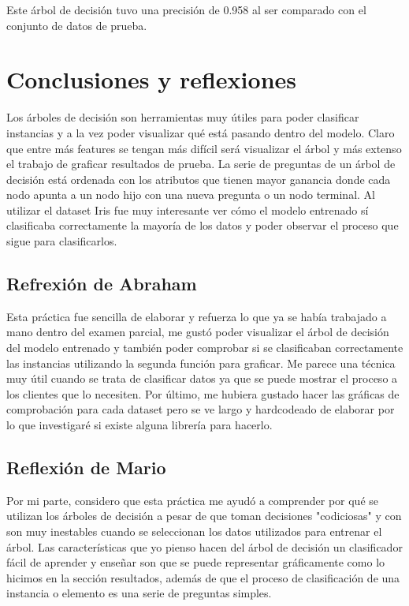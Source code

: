 \documentclass[sigconf,authorversion,nonacm]{acmart}
\begin{document}
Este árbol de decisión tuvo una precisión de 0.958 al ser comparado con el conjunto de datos de prueba.

\section{Conclusiones y reflexiones}
Los árboles de decisión son herramientas muy útiles para poder clasificar instancias y a la vez poder visualizar qué está pasando dentro del modelo. Claro que entre más features se tengan más difícil será visualizar el árbol y más extenso el trabajo de graficar resultados de prueba. La serie de preguntas de un árbol de decisión está ordenada con los atributos que tienen mayor ganancia donde cada nodo apunta a un nodo hijo con una nueva pregunta o un nodo terminal.
Al utilizar el dataset Iris fue muy interesante ver cómo el modelo entrenado sí clasificaba correctamente la mayoría de los datos y poder observar el proceso que sigue para clasificarlos.

\subsection{Refrexión de Abraham}
Esta práctica fue sencilla de elaborar y refuerza lo que ya se había trabajado a mano dentro del examen parcial, me gustó poder visualizar el árbol de decisión del modelo entrenado y también poder comprobar si se clasificaban correctamente las instancias utilizando la segunda función para graficar.
Me parece una técnica muy útil cuando se trata de clasificar datos ya que se puede mostrar el proceso a los clientes que lo necesiten.
Por último, me hubiera gustado hacer las gráficas de comprobación para cada dataset pero se ve largo y hardcodeado de elaborar por lo que investigaré si existe alguna librería para hacerlo.


\subsection{Reflexión de Mario}
Por mi parte, considero que esta práctica me ayudó a comprender por qué se utilizan los árboles de decisión a pesar de que toman decisiones "codiciosas" y con son muy inestables cuando se seleccionan los datos utilizados para entrenar el árbol. Las características que yo pienso hacen del árbol de decisión un clasificador fácil de aprender y enseñar son que se puede representar gráficamente como lo hicimos en la sección resultados, además de que el proceso de clasificación de una instancia o elemento es una serie de preguntas simples.
\end{document}
